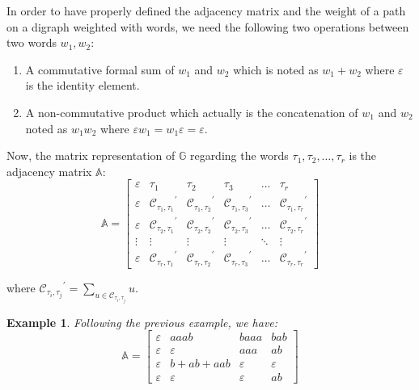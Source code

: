 \documentclass[12pt]{report}
\newtheorem{exa}[mythm]{Example}
\begin{document}
{\noindent In order to have properly defined the adjacency matrix and the weight of a path on a digraph weighted with words, we need the following two operations between two words $w_1, w_2$:

\begin{enumerate}[label=\roman{*})]
\item A commutative formal sum of $w_1$ and $w_2$ which is noted as $w_1 + w_2$ where $\varepsilon$ is the identity element.

\item A non-commutative product which actually is the concatenation of $w_1$ and $w_2$ noted as $w_1 w_2$ where $\varepsilon w_1 = w_1 \varepsilon = \varepsilon$.
\end{enumerate}


\noindent Now, the matrix representation of $\mathbb{G}$ regarding the words $\tau_1,\tau_2,\ldots,\tau_r$ is the adjacency matrix $\mathbb{A}$:
\[\mathbb{A}= \begin{bmatrix}
	\varepsilon & \tau_1 & \tau_2 & \tau_3 & \ldots & \tau_r \\
    \varepsilon & {\mathcal{C}_{\tau_1,\tau_1}}^{\prime} & {\mathcal{C}_{\tau_1,\tau_2}}^{\prime} & {\mathcal{C}_{\tau_1,\tau_3}}^{\prime} & \dots  & {\mathcal{C}_{\tau_1,\tau_r}}^{\prime} \\
    \varepsilon & {\mathcal{C}_{\tau_2,\tau_1}}^{\prime} & {\mathcal{C}_{\tau_2,\tau_2}}^{\prime} & {\mathcal{C}_{\tau_2,\tau_3}}^{\prime} & \dots  & {\mathcal{C}_{\tau_2,\tau_r}}^{\prime} \\
    \vdots & \vdots & \vdots & \vdots & \ddots & \vdots \\
    \varepsilon & {\mathcal{C}_{\tau_r,\tau_1}}^{\prime} & {\mathcal{C}_{\tau_r,\tau_2}}^{\prime} & {\mathcal{C}_{\tau_r,\tau_3}}^{\prime} & \dots  & {\mathcal{C}_{\tau_r,\tau_r}}^{\prime}
\end{bmatrix}\]

where ${\mathcal{C}_{\tau_i,\tau_j}}^{\prime}= \sum\limits_{u \in \mathcal{C}_{\tau_i,\tau_j} } u $.
\begin{exa} Following the previous example, we have:
\[\mathbb{A}= \begin{bmatrix}
	\varepsilon & aaab & baaa & bab \\
    \varepsilon & \varepsilon & aaa & ab \\
    \varepsilon & b+ab+aab & \varepsilon & \varepsilon \\
    \varepsilon & \varepsilon & \varepsilon & ab
\end{bmatrix}\]
\end{exa}

}
\end{document}
